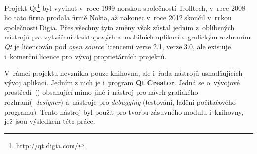 Projekt Qt\footnote{\url{http://qt.digia.com/}} byl vyvinut v~roce 1999 
norskou společností Trolltech, v~roce 2008 ho tato firma prodala firmě 
Nokia, až nakonec v~roce 2012 skončil v~rukou společnosti Digia. 
Přes všechny tyto změny však zůstal jedním z~oblíbených nástrojů pro 
vytváření desktopových a~mobilních aplikací s~grafickým rozhraním. 
\textit{Qt} je licencován pod \textit{open source} licencemi  
verze 2.1,  verze 3.0, ale existuje i~komerční licence pro~vývoj
 proprietárních projektů.

V~rámci projektu nevznikla pouze knihovna, ale i~řada nástrojů usnadňujících
vývoj aplikací. Jedním z nich je i~program \textbf{Qt Creator}. Jedná se 
o~vývojové prostředí~() obsahující mimo jiné i~nástroj pro návrh 
grafického rozhraní\linebreak[10] (\textit{~designer}) a~nástroje pro 
\textit{debugging} (testování, ladění počítačového programu).
Tento nástroj byl použit pro tvorbu zásuv\-ného modulu i~knihovny, jež jsou
výsledkem této práce.